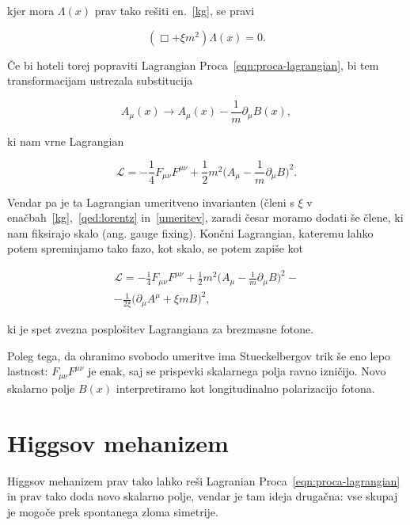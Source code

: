 \documentclass[a4paper, twocolumn, titlepage]{article}
\begin{document}
kjer mora $\Lambda (x)$ prav tako rešiti en.~\eqref{kg}, se pravi 

\begin{equation}
	(\Box + \xi m^2)\Lambda(x) = 0.
	\label{umeritev}
\end{equation}

Če bi hoteli torej popraviti Lagrangian Proca~\eqref{eqn:proca-lagrangian}, bi tem transformacijam ustrezala substitucija

\begin{equation}
	A_\mu (x) \to A_\mu (x) - \frac{1}{m}\partial_\mu B(x),
\end{equation}

ki nam vrne Lagrangian

\begin{equation}
	\mathcal{L} = -\frac{1}{4}F_{\mu\nu}F^{\mu\nu} + \frac{1}{2}m^2\Big(A_\mu - \frac{1}{m}\partial_\mu B\Big)^2.
\end{equation}

Vendar pa je ta Lagrangian umeritveno invarianten (členi s $\xi$ v enačbah~\eqref{kg},~\eqref{qed:lorentz}
in~\eqref{umeritev}, zaradi česar moramo dodati še člene, ki nam fiksirajo skalo (ang. gauge fixing). Končni Lagrangian,
kateremu lahko potem spreminjamo tako fazo, kot skalo, se potem zapiše kot

\begin{multline}
	\mathcal{L} = -\frac{1}{4}F_{\mu\nu}F^{\mu\nu} + \frac{1}{2}m^2\Big(A_\mu - \frac{1}{m}\partial_\mu B\Big)^2 -\\-
		\frac{1}{2\xi}\big(\partial_\mu A^\mu + \xi mB\big)^2,
\end{multline}

ki je spet zvezna posplošitev Lagrangiana za brezmasne fotone.

Poleg tega, da ohranimo svobodo umeritve ima Stueckelbergov trik \v se eno lepo lastnost: $F_{\mu\nu} F^{\mu\nu}$ je enak,
saj se prispevki skalarnega polja ravno izni\v cijo. Novo skalarno polje $B(x)$ interpretiramo kot longitudinalno polarizacijo
fotona.

\section{Higgsov mehanizem}

Higgsov mehanizem prav tako lahko reši Lagranian Proca~\eqref{eqn:proca-lagrangian} in prav tako doda novo skalarno polje,
vendar je tam ideja druga\v cna: vse skupaj je mogo\v ce prek spontanega zloma simetrije.
\end{document}
